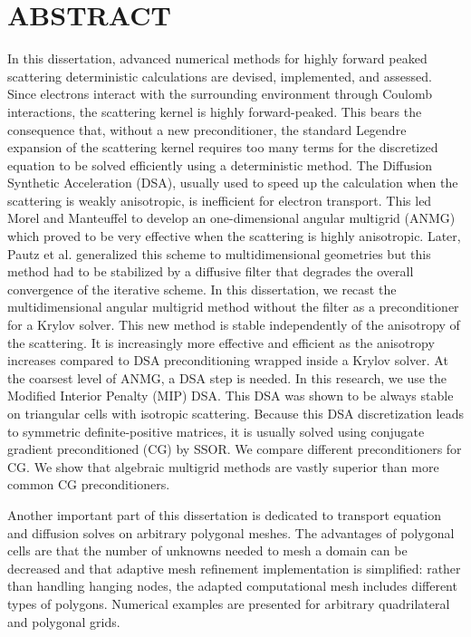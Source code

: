 \chapter*{ABSTRACT}
\pagestyle{plain}
\setcounter{page}{2}
\indent In this dissertation, advanced numerical methods for highly forward
peaked scattering deterministic calculations are devised, implemented, and
assessed. Since electrons interact with the surrounding environment through
Coulomb interactions, the scattering kernel is highly forward-peaked. 
This bears the consequence that, without a new preconditioner, the standard Legendre
expansion of the scattering kernel requires too many terms for the discretized
equation to be solved efficiently using a deterministic method. The Diffusion
Synthetic Acceleration (DSA), usually used to speed up the calculation when
the scattering is weakly anisotropic, is inefficient for electron transport.
This led Morel and Manteuffel to develop an one-dimensional angular multigrid
(ANMG) which proved to be very effective when the scattering is highly
anisotropic. Later, Pautz et al. generalized this scheme to multidimensional
geometries but this method had to be stabilized by a diffusive filter that
degrades the overall convergence of the iterative scheme. In this dissertation, we
recast the multidimensional angular multigrid method without the filter as a
preconditioner for a Krylov solver. This new method is stable independently of
the anisotropy of the scattering. It is increasingly more effective and
efficient as the anisotropy increases compared to DSA preconditioning wrapped
inside a Krylov solver. At the coarsest level of ANMG, a DSA step is needed. In
this research, we use the Modified Interior Penalty (MIP) DSA. This DSA was
shown to be always stable on triangular cells with isotropic scattering. 
Because this DSA discretization leads to symmetric definite-positive matrices, 
it is usually solved using conjugate gradient preconditioned (CG) by SSOR. We
compare different preconditioners for CG. We show that algebraic multigrid
methods are vastly superior than more common CG preconditioners.

Another important part of this dissertation is dedicated to transport 
equation and diffusion solves on arbitrary polygonal meshes. The advantages of
polygonal cells are that the number of unknowns needed to mesh a domain can be
decreased and that adaptive mesh refinement implementation is simplified:
rather than handling hanging nodes, the adapted computational mesh includes 
different types of polygons. Numerical examples are presented for arbitrary
quadrilateral and polygonal grids.
\pagebreak{}
